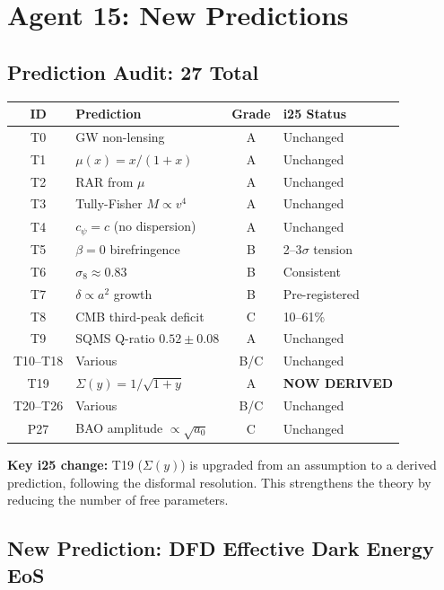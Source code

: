 \documentclass[11pt]{article}
\newcommand{\aM}{a_0}
\begin{document}
\section{Agent 15: New Predictions}

\subsection{Prediction Audit: 27 Total}

\begin{center}
\begin{tabular}{clcl}
\toprule
\textbf{ID} & \textbf{Prediction} & \textbf{Grade} & \textbf{i25 Status} \\
\midrule
T0 & GW non-lensing & A & Unchanged \\
T1 & $\mu(x) = x/(1+x)$ & A & Unchanged \\
T2 & RAR from $\mu$ & A & Unchanged \\
T3 & Tully-Fisher $M \propto v^4$ & A & Unchanged \\
T4 & $c_\psi = c$ (no dispersion) & A & Unchanged \\
T5 & $\beta = 0$ birefringence & B & 2--3$\sigma$ tension \\
T6 & $\sigma_8 \approx 0.83$ & B & Consistent \\
T7 & $\delta \propto a^2$ growth & B & Pre-registered \\
T8 & CMB third-peak deficit & C & 10--61\% \\
T9 & SQMS Q-ratio $0.52 \pm 0.08$ & A & Unchanged \\
T10--T18 & Various & B/C & Unchanged \\
T19 & $\Sigma(y) = 1/\sqrt{1+y}$ & A & \textbf{NOW DERIVED} \\
T20--T26 & Various & B/C & Unchanged \\
P27 & BAO amplitude $\propto \sqrt{\aM}$ & C & Unchanged \\
\bottomrule
\end{tabular}
\end{center}

\textbf{Key i25 change:} T19 ($\Sigma(y)$) is upgraded from an
assumption to a derived prediction, following the disformal
resolution. This strengthens the theory by reducing the number of
free parameters.

\subsection{New Prediction: DFD Effective Dark Energy EoS}
\end{document}
